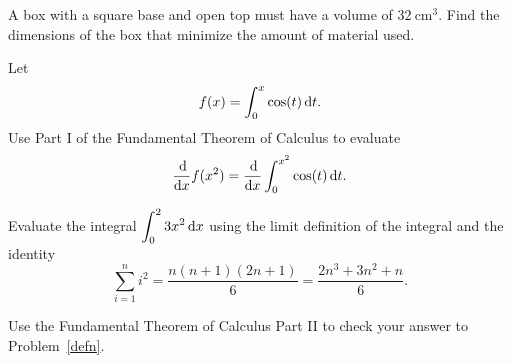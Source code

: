 \documentclass[12pt]{amsart}
\begin{document}
\begin{thm}[20 Points]
\end{thm}

\newpage


\begin{thm}[10 Points]
  A box with a square base and open top must have a volume of \(32\ \text{cm}^3\).
  Find the dimensions of the box that minimize the amount of material used.\\
\end{thm}

\vspace{3in}

\begin{thm}[10 Points]
  Let
  \[f(x) = \int_0^x \cos(t)\dif t.\]
  Use Part I of the Fundamental Theorem of Calculus to evaluate
  \[\frac{\dif}{\dif x} f(x^2) = \frac{\dif}{\dif x} \int_0^{x^2} \cos(t)\dif t.\]

\end{thm}

\newpage

\begin{thm}[10 Points]\label{defn}
  Evaluate the integral \(\displaystyle{\int_0^2 3x^2 \dif x}\) using the limit definition of the integral and the identity
  \[\sum_{i = 1}^n i^2 = \frac{n(n+1)(2n + 1)}{6} = \frac{2n^3 + 3n^2 + n}{6}.\]
\end{thm}

\vspace{5in}

\begin{thm}[10 Points]
  Use the Fundamental Theorem of Calculus Part II to check your answer to Problem~\ref{defn}.
\end{thm}
\end{document}
